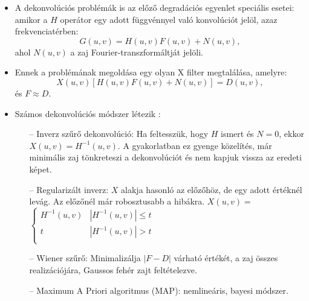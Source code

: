 \documentclass[12pt]{article}
\theoremstyle{plain}
\begin{document}
\begin{itemize}
    \item A dekonvolúciós problémák is az előző degradációs egyenlet speciális esetei: amikor a $H$ operátor egy adott függvénnyel való konvolúciót jelöl, azaz frekvenciatérben:
    $$G(u,v) = H(u,v)F(u,v) + N(u,v),$$
    ahol $N(u,v)$ a zaj Fourier-transzformáltját jelöli.
    \item Ennek a problémának megoldása egy olyan X filter megtalálása, amelyre:
    $$X(u,v)[H(u,v)F(u,v) + N(u,v)] = D(u,v) ,$$
    és $ F \approx D.$
    \item Számos dekonvolúciós módszer létezik \cite{deconv}:
    \begin{itemize}
        \item[--] Inverz szűrő dekonvolúció: Ha feltesszük, hogy $H$ ismert és $N = 0$, ekkor $X(u,v) = H^{-1}(u,v)$. A gyakorlatban ez gyenge közelítés, már minimális zaj tönkreteszi a dekonvolúciót és nem kapjuk vissza az eredeti képet.
        \item[--] Regularizált inverz: $X$ alakja hasonló az előzőhöz, de egy adott értéknél levág. Az előzőnél már robosztusabb a hibákra. $X(u,v) =$    $\left\{
        \begin{array}{ll}
          H^{-1}(u,v) & |H^{-1}(u,v)| \leq t \\
          t & |H^{-1}(u,v)| > t \\
        \end{array} \right.$
        \item[--] Wiener szűrő: Minimalizálja $|F-D|$ várható értékét, a zaj összes realizációjára, Gaussos fehér zajt feltételezve.
        \item[--] Maximum A Priori algoritmus (MAP): nemlineáris, bayesi módszer.
    \end{itemize}{}
\end{itemize}{}
\end{document}
